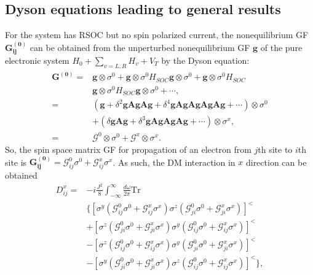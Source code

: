 \documentclass[aps,prb,twocolumn,showpacs,amssymb]{revtex4-1}
\begin{document}
\begin{appendix}
\section{Dyson equations leading to general results}\label{appendixB}
For the system has RSOC but no spin polarized current, the nonequilibrium GF $\bm{G^{(0)}_{ij}}$ can be obtained from the unperturbed nonequilibrium GF $\bm{g}$ of the pure electronic system $H_0+\sum_{v=L,R}H_{v}+V_T$ by the Dyson equation:
\begin{equation}\label{aequ:G0x}
\begin{aligned}
\bm{G^{(0)}}=&\bm{g}\otimes\sigma^{0}+\bm{g}\otimes\sigma^{0}H_{SOC}\bm{g}\otimes\sigma^{0}+\bm{g}\otimes\sigma^{0}H_{SOC}\\
&\bm{g}\otimes\sigma^{0}H_{SOC}\bm{g}\otimes\sigma^{0}+\cdots,\\
=&(\bm{g}+\delta^2\bm{g}\bm{A}\bm{g}\bm{A}\bm{g}+\delta^4\bm{g}\bm{A}\bm{g}\bm{A}\bm{g}\bm{A}\bm{g}\bm{A}\bm{g}+\cdots)\otimes\sigma^0\\
&+(\delta\bm{g}\bm{A}\bm{g}+\delta^3\bm{g}\bm{A}\bm{g}\bm{A}\bm{g}\bm{A}\bm{g}+\cdots)\otimes\sigma^x,\\
=&\bm{\mathcal{G}}^{0}\otimes\sigma^{0}+\bm{\mathcal{G}}^{x}\otimes\sigma^{x}.
\end{aligned}
\end{equation}
So, the spin space matrix GF for propagation of an electron from $j$th site to $i$th site is $\bm{G^{(0)}_{ij}}=\mathcal{G}^{0}_{ij}\sigma^{0}+\mathcal{G}^{x}_{ij}\sigma^{x}$. As such, the DM interaction in $x$ direction can be obtained
\begin{equation}\label{equ:Esd5}
\begin{aligned}
D^{x}_{ij}=&-i\frac{J^2}{8}\int^{\infty}_{-\infty}\frac{d\omega}{2\pi}\mathrm{Tr}\\
&\{[\sigma^{y}(\mathcal{G}^{0}_{ij}\sigma^{0}+\mathcal{G}^{x}_{ij}\sigma^{x})
\sigma^{z}(\mathcal{G}^{0}_{ji}\sigma^{0}+\mathcal{G}^{x}_{ji}\sigma^{x})]^{<}\\
&+[\sigma^{z}(\mathcal{G}^{0}_{ji}\sigma^{0}+\mathcal{G}^{x}_{ji}\sigma^{x})\sigma^{y}(\mathcal{G}^{0}_{ij}\sigma^{0}+\mathcal{G}^{x}_{ij}\sigma^{x})]^{<}\\
&-[\sigma^{z}(\mathcal{G}^{0}_{ij}\sigma^{0}+\mathcal{G}^{x}_{ij}\sigma^{x})
\sigma^{y}(\mathcal{G}^{0}_{ji}\sigma^{0}+\mathcal{G}^{x}_{ji}\sigma^{x})]^{<}\\
&-[\sigma^{y}(\mathcal{G}^{0}_{ji}\sigma^{0}+\mathcal{G}^{x}_{ji}\sigma^{x})\sigma^{z}(\mathcal{G}^{0}_{ij}\sigma^{0}+\mathcal{G}^{x}_{ij}\sigma^{x})]^{<}\},\\

\end{aligned}
\end{equation}
\end{appendix}
\end{document}

